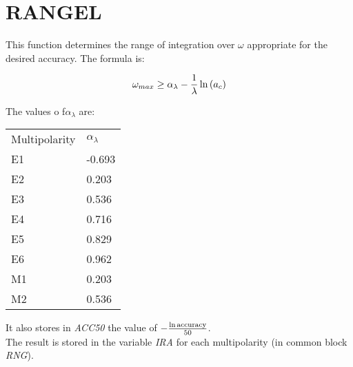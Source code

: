 \section{RANGEL}
\label{sect:rangel}

\noindent This function determines the range of integration over $\omega$
appropriate for the desired accuracy. The formula is:

\begin{equation}
\omega_{max} \ge \alpha_\lambda - {1 \over \lambda} \ln{(a_c)}
\end{equation}

\noindent The values o f$\alpha_\lambda$ are:\\

\begin{tabular}{ll}
Multipolarity & $\alpha_\lambda$\\
E1 & -0.693\\
E2 & 0.203\\
E3 & 0.536\\
E4 & 0.716\\
E5 & 0.829\\
E6 & 0.962\\
M1 & 0.203\\
M2 & 0.536\\
\end{tabular}

\noindent It also stores in {\em ACC50} the value of $-{\ln\mathrm{accuracy}
\over 50}$.\\

\noindent The result is stored in the variable {\em IRA} for each
multipolarity (in common block {\em RNG}).\\

